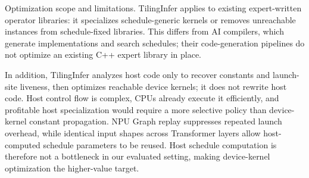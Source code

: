 {\color{red}%
\par}

{\color{blue}%
Optimization scope and limitations. TilingInfer applies to existing expert-written operator libraries: it specializes schedule-generic kernels or removes unreachable instances from schedule-fixed libraries. This differs from AI compilers, which generate implementations and search schedules; their code-generation pipelines do not optimize an existing C++ expert library in place.
\par}

{\color{blue}%
In addition, TilingInfer analyzes host code only to recover constants and launch-site liveness, then optimizes reachable device kernels; it does not rewrite host code. Host control flow is complex, CPUs already execute it efficiently, and profitable host specialization would require a more selective policy than device-kernel constant propagation. NPU Graph replay suppresses repeated launch overhead, while identical input shapes across Transformer layers allow host-computed schedule parameters to be reused. Host schedule computation is therefore not a bottleneck in our evaluated setting, making device-kernel optimization the higher-value target.
\par}
